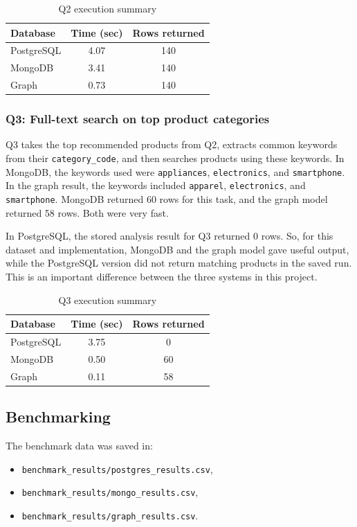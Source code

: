 \documentclass[11pt,a4paper]{article}
\begin{document}
\begin{table}[htbp]
    \centering
    \caption{Q2 execution summary}
    \begin{tabular}{lcc}
        \hline
        Database & Time (sec) & Rows returned \\
        \hline
        PostgreSQL & 4.07 & 140 \\
        MongoDB & 3.41 & 140 \\
        Graph & 0.73 & 140 \\
        \hline
    \end{tabular}
\end{table}

\subsubsection{Q3: Full-text search on top product categories}
Q3 takes the top recommended products from Q2, extracts common keywords from their \texttt{category\_code}, and then searches products using these keywords. In MongoDB, the keywords used were \texttt{appliances}, \texttt{electronics}, and \texttt{smartphone}. In the graph result, the keywords included \texttt{apparel}, \texttt{electronics}, and \texttt{smartphone}. MongoDB returned 60 rows for this task, and the graph model returned 58 rows. Both were very fast.

In PostgreSQL, the stored analysis result for Q3 returned 0 rows. So, for this dataset and implementation, MongoDB and the graph model gave useful output, while the PostgreSQL version did not return matching products in the saved run. This is an important difference between the three systems in this project.

\begin{table}[htbp]
    \centering
    \caption{Q3 execution summary}
    \begin{tabular}{lcc}
        \hline
        Database & Time (sec) & Rows returned \\
        \hline
        PostgreSQL & 3.75 & 0 \\
        MongoDB & 0.50 & 60 \\
        Graph & 0.11 & 58 \\
        \hline
    \end{tabular}
\end{table}

\subsection{Benchmarking}
The benchmark data was saved in:
\begin{itemize}
    \item \texttt{benchmark\_results/postgres\_results.csv},
    \item \texttt{benchmark\_results/mongo\_results.csv},
    \item \texttt{benchmark\_results/graph\_results.csv}.
\end{itemize}
\end{document}
